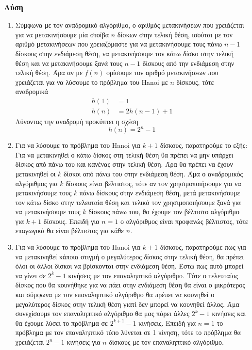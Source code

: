 \documentclass[12pt]{report}
\newcommand{\en}[1]{\textlatin{#1}}
\begin{document}
\subsubsection*{Λύση}
\begin{enumerate}
\item
Σύμφωνα με τον αναδρομικό αλγόριθμο, ο αριθμός μετακινήσεων που χρειάζεται
για να μετακινήσουμε μία στοίβα $n$ δίσκων στην τελική θέση, ισούται με τον 
αριθμό μετακινήσεων που χρειαζόμαστε για να μετακινήσουμε τους πάνω $n-1$ 
δίσκους στην ενδιάμεση θέση, να μετακινήσουμε τον κάτω δίσκο στην τελική θέση 
και να μετακινήσουμε ξανά τους $n-1$ δίσκους από την ενδιάμεση στην τελική θέση.
Άρα αν με $f(n)$ ορίσουμε τον αριθμό μετακινήσεων που χρειάζεται για να 
λύσουμε το πρόβλημα του \en{Hanoi} με $n$ δίσκους, τότε αναδρομικά
\begin{align*}
h(1) &= 1\\
h(n) &= 2h(n-1) + 1
\end{align*}
Λύνοντας την αναδρομή προκύπτει η σχέση
\begin{equation*} h(n) = 2^n - 1 \end{equation*}

\item
Για να λύσουμε το πρόβλημα του \en{Hanoi} για $k+1$ 
δίσκους, παρατηρούμε το εξής: Για να μετακινηθεί ο κάτω δίσκος στη 
τελική θέση θα πρέπει να μην υπάρχει δίσκος από πάνω του και κανένας
στην τελική θέση. Άρα θα πρέπει να έχουν μετακινηθεί οι $k$ δίσκοι
από πάνω του στην ενδιάμεση θέση. Άμα ο αναδρομικός αλγόριθμος για $k$ 
δίσκους είναι βέλτιστος, τότε αν τον χρησιμοποιήσουμε για να μετακινήσουμε
τους $k$ πάνω δίσκους στην ενδιάμεση θέση, μετά μετακινήσουμε τον κάτω
δίσκο στην τελευταία θέση και τελικά τον χρησιμοποιήσουμε ξανά για να 
μετακινήσουμε τους $k$ δίσκους πάνω του, θα έχουμε τον βέλτιστο αλγόριθμο
για $k+1$ δίσκους. Επειδή για $n=1$ ο αλγόριθμος είναι προφανώς βέλτιστος,
τότε επαγωγικά θα είναι βέλτιστος για κάθε $n$.

\item
Για να λύσουμε το πρόβλημα του \en{Hanoi} για $k+1$ δίσκους, παρατηρούμε
πως για να μετακινηθεί κάποια στιγμή ο μεγαλύτερος δίσκος στην τελική θέση, θα 
πρέπει όλοι οι άλλοι δίσκοι να βρίσκονται στην ενδιάμεση θέση. Έστω πως
αυτό μπορεί να γίνει σε $2^k - 1$ κινήσεις με τον επαναληπτικό αλγόριθμο. Τότε
ο τελευταίος δίσκος που θα κουνήθηκε για να πάει στην ενδιάμεση θέση θα είναι
ο μικρότερος και σύμφωνα με τον επαναληπτικό αλγόριθμο θα πρέπει να κουνηθεί
ο μεγαλύτερος δίσκος στην τελική θέση γιατί δεν μπορεί να κουνηθεί άλλος. 
Άμα συνεχίσουμε τον επαναληπτικό αλγόριθμο θα μας πάρει άλλες $2^k-1$ 
κινήσεις και θα έχουμε λύσει το πρόβλημα σε $2^{k+1} - 1$ κινήσεις.
Επειδή για $n=1$ το πρόβλημα με τον επαναληπτικό τύπο λύνεται σε 1 κίνηση,
τότε το πρόβλημα θα χρειάζεται $2^n -1$ κινήσεις για $n$ δίσκους με τον
επαναληπτικό αλγόριθμο.
\end{enumerate}
\end{document}
